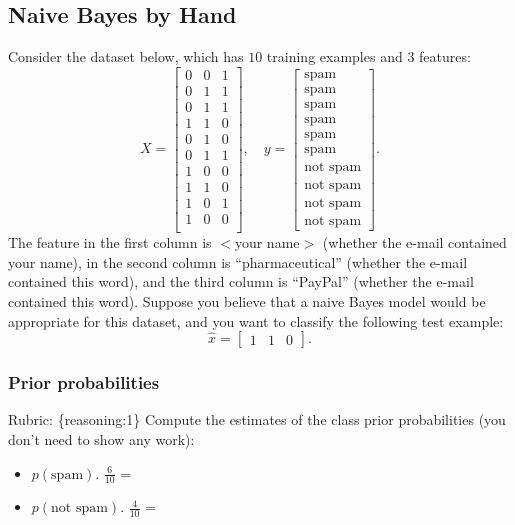 \documentclass{article}
\def\rubric#1{\gre{Rubric: \{#1\}}}{}
\def\blu#1{{\color{blu}#1}}
\def\gre#1{{\color{gre}#1}}
\def\ans#1{{\color{ans}#1}}
\def\items#1{\begin{itemize}#1\end{itemize}}
\begin{document}
\subsection{Naive Bayes by Hand}

Consider the dataset below, which has $10$ training examples and $3$ features:
\[
X = \begin{bmatrix}0 & 0 & 1\\0 & 1 & 1\\ 0 & 1 & 1\\ 1 & 1 & 0\\0 & 1 & 0\\0 & 1 & 1\\1 & 0 & 0\\1 & 1 & 0\\1 & 0 & 1\\1 & 0 & 0\\\end{bmatrix}, \quad y = \begin{bmatrix}\text{spam}\\\text{spam}\\\text{spam}\\\text{spam}\\\text{spam}\\\text{spam}\\\text{not spam}\\\text{not spam}\\\text{not spam}\\\text{not spam}\end{bmatrix}.
\]
The feature in the first column is $<$your name$>$ (whether the e-mail contained your name), in the second column is ``pharmaceutical'' (whether the e-mail contained this word), and the third column is ``PayPal'' (whether the e-mail contained this word).
Suppose you believe that a naive Bayes model would be appropriate for this dataset, and you want to classify the following test example:
\[
\hat{x} = \begin{bmatrix}1 & 1 & 0\end{bmatrix}.
\]

\subsubsection{Prior probabilities}
\rubric{reasoning:1}
\blu{Compute the estimates of the class prior probabilities} (you don't need to show any work):
\items{
\item $p(\text{spam})$.
\ans{
   $\frac{6}{10}$ =
   \fbox{
      0.6
   }
}
\item $p(\text{not spam})$.
\ans{
   $\frac{4}{10}$ =
   \fbox{
      0.4
   }
}
}
\end{document}
